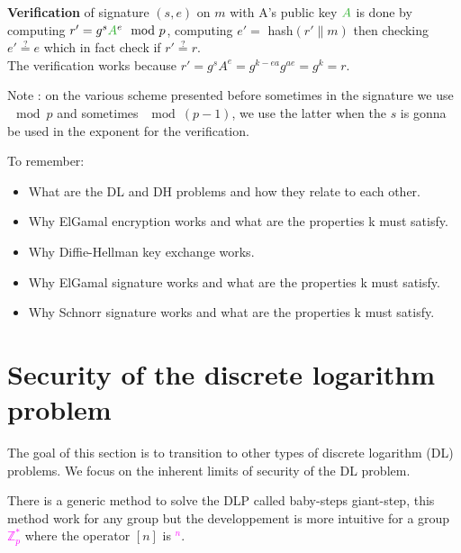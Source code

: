 \documentclass[11pt,a4paper]{report}
\newcommand{\tg}{\textcolor{ao}}
\begin{document}
\textbf{Verification} of signature $(s,e)$ on $m$ with A's public key $\tg{A}$ is done by computing $r' = g^s \tg{A}^e \mod p$, computing $e' =$ hash$(r' \parallel m)$ then checking $e' \stackrel{?}{=} e$ which in fact check if $r' \stackrel{?}{=} r$.\\

The verification works because $r' = g^s A^e = g^{k-ea} g^{ae} = g^k = r$.

Note : on the various scheme presented before sometimes in the signature we use $\mod p$ and sometimes $\mod (p-1)$, we use the latter when the $s$ is gonna be used in the exponent for the verification.
 
To remember:
\begin{itemize}
\item What are the DL and DH problems and how they relate to each other.
\item Why ElGamal encryption works and what are the properties k must satisfy.
\item Why Diffie-Hellman key exchange works.
\item Why ElGamal signature works and what are the properties k must satisfy.
\item Why Schnorr signature works and what are the properties k must satisfy.
\end{itemize}

\section{Security of the discrete logarithm problem}
The goal of this section is to transition to other types of discrete logarithm (DL) problems. We focus on the inherent limits of security of the DL problem.

There is a generic method to solve the DLP called baby-steps giant-step, this method work for any group but the developpement is more intuitive for a group \textcolor{magenta}{$\mathbb{Z}_p^*$} where the operator $[n]$ is \textcolor{magenta}{$^n$}.\\
\end{document}
